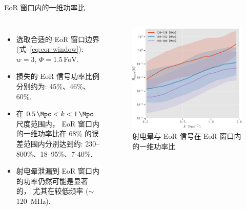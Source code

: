 \documentclass{beamer}
\begin{document}
\begin{frame}{EoR 窗口内的一维功率比}
  \begin{columns}
    \begin{itemize}
      \item 选取合适的 EoR 窗口边界 (式~\ref{eq:eor-window}):
        $w = 3$, $\Phi = 1.5$\,FoV.
      \item 损失的 EoR 信号功率比例分别约为: 45\%、46\%、60\%.
      \item 在 $\SI{0.5}{\per\Mpc} < k < \SI{1}{\per\Mpc}$ 尺度范围内，
        EoR 窗口内的一维功率比在 68\% 的误差范围内分别达到约:
        230--800\%、18--95\%、7-40\%.
      \item 射电晕泄漏到 EoR 窗口内的功率仍然可能是显著的，
        尤其在较低频率 ($\sim$\,\SI{120}{\MHz}).
    \end{itemize}

    \begin{figure}
      \centering
      \includegraphics[width=\columnwidth]{ps1d-ratio-3bands}
      \caption{射电晕与 EoR 信号在 EoR 窗口内的一维功率比}
    \end{figure}
  \end{columns}
\end{frame}
\end{document}
